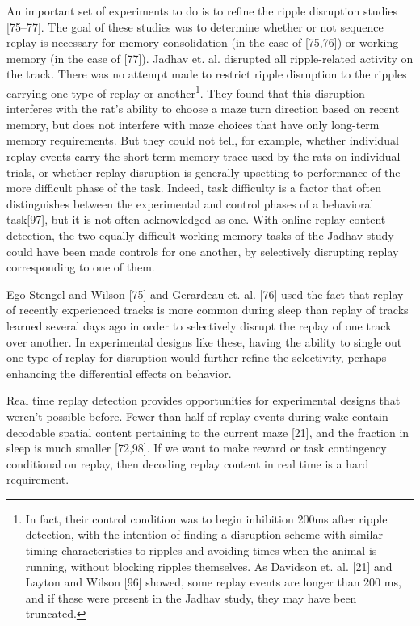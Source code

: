 \documentclass[]{article}
\begin{document}
An important set of experiments to do is to refine the ripple disruption
studies {[}75--77{]}. The goal of these studies was to determine whether
or not sequence replay is necessary for memory consolidation (in the
case of {[}75,76{]}) or working memory (in the case of {[}77{]}). Jadhav
et. al. disrupted all ripple-related activity on the track. There was no
attempt made to restrict ripple disruption to the ripples carrying one
type of replay or another\footnote{In fact, their control condition was
  to begin inhibition 200ms after ripple detection, with the intention
  of finding a disruption scheme with similar timing characteristics to
  ripples and avoiding times when the animal is running, without
  blocking ripples themselves. As Davidson et. al. {[}21{]} and Layton
  and Wilson {[}96{]} showed, some replay events are longer than 200 ms,
  and if these were present in the Jadhav study, they may have been
  truncated.}. They found that this disruption interferes with the rat's
ability to choose a maze turn direction based on recent memory, but does
not interfere with maze choices that have only long-term memory
requirements. But they could not tell, for example, whether individual
replay events carry the short-term memory trace used by the rats on
individual trials, or whether replay disruption is generally upsetting
to performance of the more difficult phase of the task. Indeed, task
difficulty is a factor that often distinguishes between the experimental
and control phases of a behavioral task{[}97{]}, but it is not often
acknowledged as one. With online replay content detection, the two
equally difficult working-memory tasks of the Jadhav study could have
been made controls for one another, by selectively disrupting replay
corresponding to one of them.

Ego-Stengel and Wilson {[}75{]} and Gerardeau et. al. {[}76{]} used the
fact that replay of recently experienced tracks is more common during
sleep than replay of tracks learned several days ago in order to
selectively disrupt the replay of one track over another. In
experimental designs like these, having the ability to single out one
type of replay for disruption would further refine the selectivity,
perhaps enhancing the differential effects on behavior.

Real time replay detection provides opportunities for experimental
designs that weren't possible before. Fewer than half of replay events
during wake contain decodable spatial content pertaining to the current
maze {[}21{]}, and the fraction in sleep is much smaller {[}72,98{]}. If
we want to make reward or task contingency conditional on replay, then
decoding replay content in real time is a hard requirement.
\end{document}
